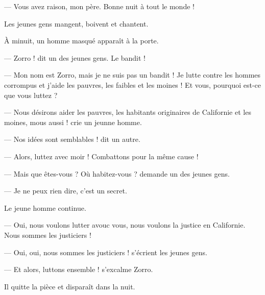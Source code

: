 --- Vous avez raison, mon père. Bonne nuit à tout le monde !

Les jeunes gens mangent, boivent et chantent.

À minuit, un homme masqué apparaît à la porte.

--- Zorro ! dit un des jeunes gens. Le bandit !

--- Mon nom est Zorro, mais je ne suis pas un bandit ! Je lutte contre les hommes corrompus et j'aide les pauvres, les faibles et
    les moines ! Et vous, pourquoi est-ce que vous luttez ?

--- Nous désirons aider les pauvres, les habitants originaires de Californie et les moines, mous aussi ! crie un jeunne homme.

--- Nos idées sont semblables ! dit un autre.

--- Alors, luttez avec moir ! Combattons pour la même cause !

--- Mais que êtes-vous ? Où habitez-vous ? demande un des jeunes gens.

--- Je ne peux rien dire, c'est un secret.

Le jeune homme continue.

--- Oui, nous voulons lutter avouc vous, nous voulons la justice en Californie. Nous sommes les justiciers !

--- Oui, oui, nous sommes les justiciers ! s'écrient les jeunes gens.

--- Et alors, luttons ensemble ! s'excalme Zorro.

Il quitte la pièce et disparaît dans la nuit.
